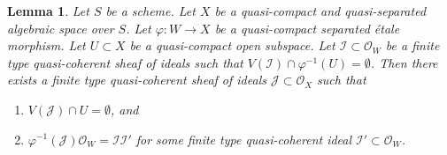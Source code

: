 \documentclass[10pt,a4paper]{amsart}
\theoremstyle{plain}
\newtheorem{lemma}[subsection]{Lemma}
\theoremstyle{definition}
\theoremstyle{remark}
\numberwithin{equation}{subsection}
\begin{document}
\begin{lemma}
\label{lemma-push-ideal}
Let $S$ be a scheme. Let $X$ be a quasi-compact and quasi-separated
algebraic space over $S$. Let $\varphi : W \to X$ be a quasi-compact
separated \'etale morphism. Let $U \subset X$ be a quasi-compact open
subspace. Let $\mathcal{I} \subset \mathcal{O}_W$ be a finite type
quasi-coherent sheaf of ideals such that
$V(\mathcal{I}) \cap \varphi^{-1}(U) = \emptyset$.
Then there exists a finite type quasi-coherent sheaf of ideals
$\mathcal{J} \subset \mathcal{O}_X$ such that
\begin{enumerate}
\item $V(\mathcal{J}) \cap U = \emptyset$, and
\item $\varphi^{-1}(\mathcal{J})\mathcal{O}_W = \mathcal{I} \mathcal{I}'$
for some finite type quasi-coherent ideal
$\mathcal{I}' \subset \mathcal{O}_W$.
\end{enumerate}
\end{lemma}
\end{document}
